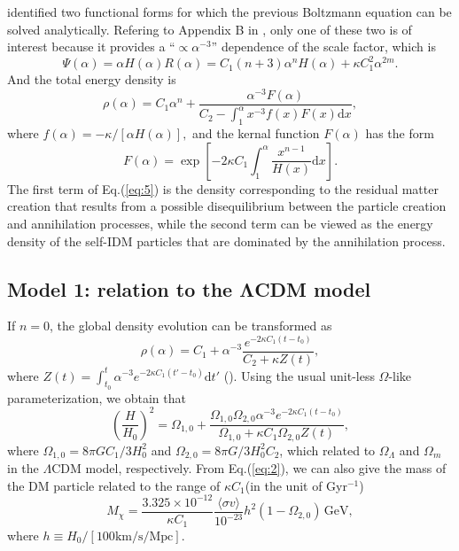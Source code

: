 \documentclass[twocolumn]{aastex631}
\begin{document}
   \cite{Basilakos_2009} identified two functional forms for which
   the previous Boltzmann equation can be solved analytically.
   Refering to Appendix B in \cite{Basilakos_2009}, only one of these two is of interest
   because it provides a ``$\propto\alpha^{-3}$'' dependence of the scale factor,
   which is \begin{equation}
      \Psi(\alpha)=\alpha H(\alpha)R(\alpha)=C_1(n+3)\alpha^nH(\alpha)+\kappa C_1^2 \alpha^{2m}.
      \label{eq:4}
   \end{equation}
   And the total energy density is
   \begin{equation}
      \rho(\alpha)=C_1 \alpha^n+\frac{\alpha^{-3}F(\alpha)}{C_2-\int_1^{\alpha}x^{-3}f(x)F(x)\mathrm{d}x},
      \label{eq:5}
   \end{equation}
   where $f(\alpha)=-\kappa/[\alpha H(\alpha)],$ and the kernal function $F(\alpha)$ has
   the form \begin{equation}
      F(\alpha)=\exp\left[-2\kappa C_1\int_1^{\alpha}\frac{x^{n-1}}{H(x)}\mathrm{d}x\right].
      \label{eq:6}
   \end{equation}
   The first term of Eq.(\ref{eq:5}) is the density corresponding to the
   residual matter creation that results from a possible disequilibrium
   between the particle creation and annihilation processes, while the second
   term can be viewed as the energy density of the self-IDM particles that are
   dominated by the annihilation process.

\subsection{Model 1: relation to the ΛCDM model}

   If $n=0$, the global density evolution can be transformed as
   \begin{equation}
      \rho(\alpha)=C_1+\alpha^{-3}\frac{e^{-2\kappa C_1(t-t_0)}}{C_2+\kappa Z(t)},
      \label{eq:7}
   \end{equation}
   where $Z(t)=\int_{t_0}^t \alpha^{-3}e^{-2\kappa C_1(t'-t_0)}\mathrm{d}t'$ (\cite{Basilakos_2009}).
   Using the usual unit-less $\Omega$-like parameterization, we obtain that
   \begin{equation}
      \left(\frac{H}{H_0}\right)^2=\Omega_{1,0}+\frac{\Omega_{1,0}\Omega_{2,0}\alpha^{-3}e^{-2\kappa C_1(t-t_0)}}
      {\Omega_{1,0}+\kappa C_1\Omega_{2,0}Z(t)},
      \label{eq:8}
   \end{equation}
   where $\Omega_{1,0}=8\pi GC_1/3H_0^2$ and $\Omega_{2,0}=8\pi G/3H_0^2C_2$,
   which related to $\Omega_{\Lambda}$ and $\Omega_m$ in the $\Lambda$CDM model,
   respectively.
   From Eq.({\ref{eq:2}}), we can also give the mass of the DM particle
   related to the range of $\kappa C_1$(in the unit of Gyr${}^{-1}$)
   \begin{equation}
      M_{\chi}=\frac{3.325\times10^{-12}}{\kappa C_1}
      \frac{\langle\sigma v\rangle}{10^{-23}}h^2(1-\Omega_{2,0})\,\text{GeV},
      \label{eq:9}
   \end{equation}
   where $h\equiv H_0/[100\text{km/s/Mpc}]$.
\end{document}
